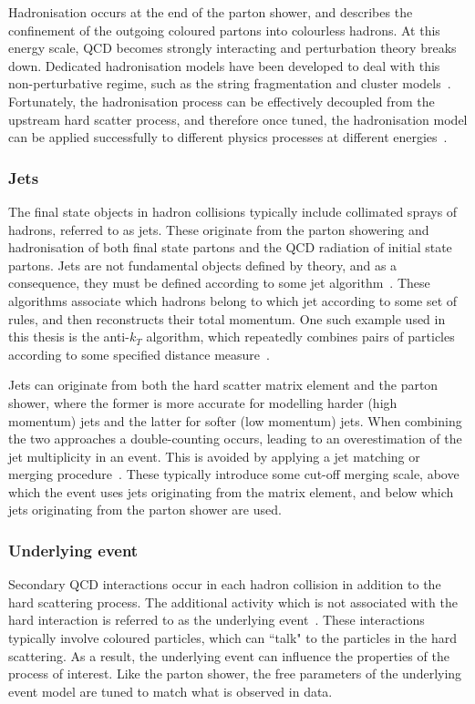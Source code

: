 Hadronisation occurs at the end of the parton shower, and describes the confinement of the outgoing coloured partons into colourless hadrons. At this energy scale, QCD becomes strongly interacting and perturbation theory breaks down. Dedicated hadronisation models have been developed to deal with this non-perturbative regime, such as the string fragmentation and cluster models~\cite{Andersson:1983ia,Andersson:1998tv,Amati:1979fg}. Fortunately, the hadronisation process can be effectively decoupled from the upstream hard scatter process, and therefore once tuned, the hadronisation model can be applied successfully to different physics processes at different energies~\cite{Buckley:2011ms}.

\subsubsection{Jets}
The final state objects in hadron collisions typically include collimated sprays of hadrons, referred to as jets. These originate from the parton showering and hadronisation of both final state partons and the QCD radiation of initial state partons. Jets are not fundamental objects defined by theory, and as a consequence, they must be defined according to some jet algorithm~\cite{Salam:2009jx}. These algorithms associate which hadrons belong to which jet according to some set of rules, and then reconstructs their total momentum. One such example used in this thesis is the anti-$k_T$ algorithm, which repeatedly combines pairs of particles according to some specified distance measure~\cite{Cacciari:2008gp}.

Jets can originate from both the hard scatter matrix element and the parton shower, where the former is more accurate for modelling harder (high momentum) jets and the latter for softer (low momentum) jets. When combining the two approaches a double-counting occurs, leading to an overestimation of the jet multiplicity in an event. This is avoided by applying a jet matching or merging procedure~\cite{Alwall:2007fs}. These typically introduce some cut-off merging scale, above which the event uses jets originating from the matrix element, and below which jets originating from the parton shower are used.

\subsubsection{Underlying event}
Secondary QCD interactions occur in each hadron collision in addition to the hard scattering process. The additional activity which is not associated with the hard interaction is referred to as the underlying event~\cite{Buckley:2011ms}. These interactions typically involve coloured particles, which can ``talk" to the particles in the hard scattering. As a result, the underlying event can influence the properties of the process of interest. Like the parton shower, the free parameters of the underlying event model are tuned to match what is observed in data. 


